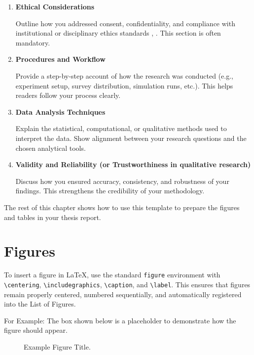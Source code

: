 \begin{enumerate}
  \item \textbf{Ethical Considerations}\par
  Outline how you addressed consent, confidentiality, and compliance with institutional or disciplinary ethics standards \cite{bera2018}, \cite{apa2017}. This section is often mandatory.

  \item \textbf{Procedures and Workflow}\par
  Provide a step-by-step account of how the research was conducted (e.g., experiment setup, survey distribution, simulation runs, etc.). This helps readers follow your process clearly.

  \item \textbf{Data Analysis Techniques}\par
  Explain the statistical, computational, or qualitative methods used to interpret the data. Show alignment between your research questions and the chosen analytical tools.

  \item \textbf{Validity and Reliability (or Trustworthiness in qualitative research)}\par
  Discuss how you ensured accuracy, consistency, and robustness of your findings. This strengthens the credibility of your methodology.
\end{enumerate}

The rest of this chapter shows how to use this template to prepare the figures and tables in your thesis report.

\section{Figures}
\label{sec:figures}

To insert a figure in \LaTeX{}, use the standard \texttt{figure} environment with \texttt{\textbackslash centering}, \texttt{\textbackslash includegraphics}, \texttt{\textbackslash caption}, and \texttt{\textbackslash label}. This ensures that figures remain properly centered, numbered sequentially, and automatically registered into the List of Figures.

For Example: The box shown below is a placeholder to demonstrate how the figure should appear.

\begin{figure}[htbp]
  \centering
  \caption{Example Figure Title.}
  \label{fig:example-figure-1}
\end{figure}

